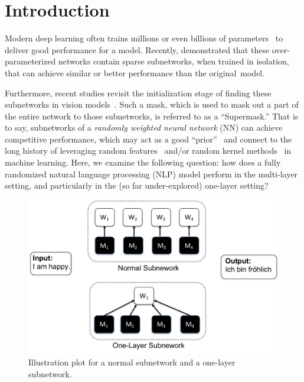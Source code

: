 \vspace{-2mm}
\section{Introduction}
\label{sec:intro}
\vspace{-1mm}

Modern deep learning often trains millions or even billions of parameters~\citep{Devlin:2018bert,shoeybi2019megatron,raffel2019exploring,brown2020language} to deliver good performance for a model. 
Recently, \citet{frankle2018lottery,frankle2020linear} demonstrated that these over-parameterized  networks contain sparse subnetworks, when trained in isolation, that can achieve similar or better performance than the original~model.

Furthermore, recent studies revisit the initialization stage of finding these subnetworks in vision models~\citep{Zhou:2019deconstructing,Ramanujan:2020hidden}.
Such a mask, which is used to mask out a part of the entire network to those subnetworks, is referred to as a ``Supermask.'' 
That is to say, subnetworks of a \textit{randomly weighted neural network} (NN) can achieve competitive performance, which may act as a good  ``prior''~\citep{gaier2019weight} and connect to the long history of leveraging random features~\citep{Gamba:1961papa,Baum:1988jc} and/or random kernel methods~\citep{Rahimi:2008random,Rahimi:2009kitchen} in machine learning. 
Here, we examine the following question: how does a fully randomized natural language processing (NLP) model perform in the multi-layer setting, and particularly in the (so far under-explored) one-layer setting?

\begin{figure}
    \centering
    \includegraphics[width=0.8\linewidth]{fig/sketch.pdf}
            \vspace{-5pt}
    \caption{ Illustration plot for a normal subnetwork and a one-layer subnetwork.}
    \label{fig:model_illustration}
    \vspace{-6mm}
\end{figure}

